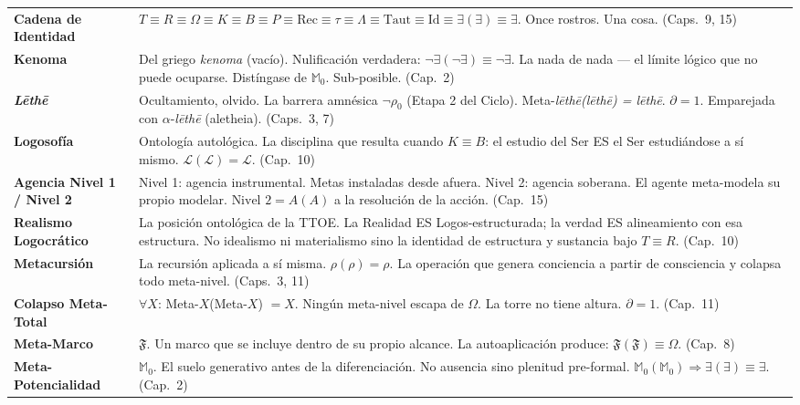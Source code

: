\documentclass[10pt, openany, oneside]{book}
\begin{document}
{\begin{tabular}{@{} l @{\hspace{0.6em}} p{} @{}}
\textbf{Cadena de Identidad} & $T \equiv R \equiv \Omega \equiv K \equiv B \equiv P \equiv \text{Rec} \equiv \tau \equiv \Lambda \equiv \text{Taut} \equiv \text{Id} \equiv \exists(\exists) \equiv \exists$. Once rostros. Una cosa. (Caps.\ 9, 15) \\[0.3em]
\textbf{Kenoma} & Del griego \textit{kenoma} (vacío). Nulificación verdadera: $\neg\exists(\neg\exists) \equiv \neg\exists$. La nada de nada --- el límite lógico que no puede ocuparse. Distíngase de $\mathbb{M}_0$. Sub-posible. (Cap.\ 2) \\[0.3em]
\textbf{\textit{L\={e}th\={e}}} & Ocultamiento, olvido. La barrera amnésica $\neg\rho_0$ (Etapa 2 del Ciclo). Meta-\textit{l\={e}th\={e}(l\={e}th\={e}) = l\={e}th\={e}}. $\partial = 1$. Emparejada con $\alpha$-\textit{l\={e}th\={e}} (aletheia). (Caps.\ 3, 7) \\[0.3em]
\textbf{Logosofía} & Ontología autológica. La disciplina que resulta cuando $K \equiv B$: el estudio del Ser ES el Ser estudiándose a sí mismo. $\mathcal{L}(\mathcal{L}) = \mathcal{L}$. (Cap.\ 10) \\[0.3em]
\textbf{Agencia Nivel 1 / Nivel 2} & Nivel 1: agencia instrumental. Metas instaladas desde afuera. Nivel 2: agencia soberana. El agente meta-modela su propio modelar. $\text{Nivel 2} = A(A)$ a la resolución de la acción. (Cap.\ 15) \\[0.3em]
\textbf{Realismo Logocrático} & La posición ontológica de la TTOE. La Realidad ES Logos-estructurada; la verdad ES alineamiento con esa estructura. No idealismo ni materialismo sino la identidad de estructura y sustancia bajo $T \equiv R$. (Cap.\ 10) \\[0.3em]
\textbf{Metacursión} & La recursión aplicada a sí misma. $\rho(\rho) = \rho$. La operación que genera conciencia a partir de consciencia y colapsa todo meta-nivel. (Caps.\ 3, 11) \\[0.3em]
\textbf{Colapso Meta-Total} & $\forall X$: Meta-$X$(Meta-$X$) $= X$. Ningún meta-nivel escapa de $\Omega$. La torre no tiene altura. $\partial = 1$. (Cap.\ 11) \\[0.3em]
\textbf{Meta-Marco} & $\mathfrak{F}$. Un marco que se incluye dentro de su propio alcance. La autoaplicación produce: $\mathfrak{F}(\mathfrak{F}) \equiv \Omega$. (Cap.\ 8) \\[0.3em]
\textbf{Meta-Potencialidad} & $\mathbb{M}_0$. El suelo generativo antes de la diferenciación. No ausencia sino plenitud pre-formal. $\mathbb{M}_0(\mathbb{M}_0) \Rightarrow \exists(\exists) \equiv \exists$. (Cap.\ 2) \\[0.3em]

\end{tabular}}
\end{document}
